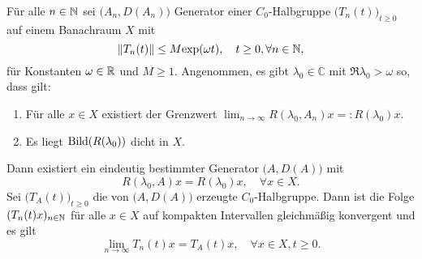 
 
\begin{satz}\label{Trotter-Kato}
Für alle $n\in\mathbb{N}$ sei $\big(A_n, D(A_n)\big)$ Generator einer $C_0$-Halbgruppe $\big(T_n(t)\big)_{t\geq0}$ auf einem Banachraum $X$  mit 
\begin{equation*}
    \|T_n(t)\|\leq M\textnormal{exp}(\omega t),\quad t\geq0,\forall n\in \mathbb{N},
\end{equation*}
für Konstanten $\omega\in\mathbb{R}$ und $M\geq1$.
Angenommen, es gibt  $\lambda_0\in\mathbb C$ mit $\mathfrak R\lambda_0 >\omega$ so, dass gilt:
\begin{enumerate}
\item Für alle $x\in X$ existiert der Grenzwert $\lim_{n\to\infty}R(\lambda_0, A_n)x =:R(\lambda_0)x$.
\item Es liegt $\textnormal{Bild}(R(\lambda_0))$ dicht in $X$.
\end{enumerate}
Dann existiert ein eindeutig bestimmter Generator $\big(A, D(A)\big)$ mit
\begin{equation*}
R(\lambda_0, A)x=R(\lambda_0)x,\quad\forall x\in X.
\end{equation*}
Sei $\big(T_A(t)\big)_{t\geq0}$ die von $\big(A, D(A)\big)$ erzeugte $C_0$-Halbgruppe. Dann ist die Folge $(T_n(t)x)_{n\in\mathbb{N}}$ für alle $x\in X$  auf kompakten Intervallen gleichmäßig konvergent und es gilt
\begin{equation*}
\lim_{n\to\infty}T_n(t)x=T_A(t)x,\quad \forall x\in X, t\geq0.
\end{equation*}
\end{satz}



